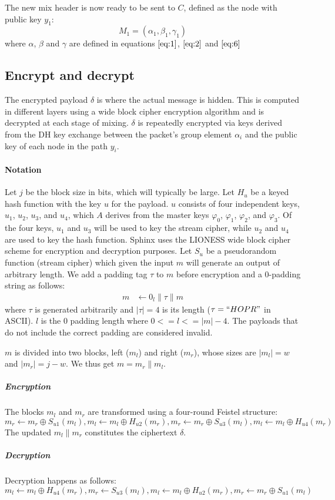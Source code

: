 The new mix header is now ready to be sent to $C$, defined as the node with public key $y_1$:
$$M_1=(\alpha_1,\beta_1,\gamma_1)$$
where $\alpha$, $\beta$ and $\gamma$ are defined in equations $\ref{eq:1}$, $\ref{eq:2}$ and $\ref{eq:6}$
\subsection{Encrypt and decrypt}
The encrypted payload $\delta$ is where the actual message is hidden. This is computed in different layers using a wide block cipher encryption algorithm and is decrypted at each stage of mixing.
$\delta$ is repeatedly encrypted via keys derived from the DH key exchange between the packet’s group element $\alpha_i$ and the public key of each node in the path $y_i$.

\paragraph{Notation}
Let $j$ be the block size in bits, which will typically be large. Let $H_u$ be a keyed hash function with the key $u$ for the payload. $u$ consists of four independent keys, $u_1$, $u_2$, $u_3$, and $u_4$, which $A$ derives from the master keys $\varphi_0$, $\varphi_1$, $\varphi_2$, and $\varphi_3$. Of the four keys, $u_1$ and $u_3$ will be used to key the stream cipher, while $u_2$ and $u_4$ are used to key the hash function. Sphinx uses the LIONESS wide block cipher scheme for encryption and decryption purposes.
Let $S_u$ be a pseudorandom function (stream cipher) which given the input $m$ will generate an output of arbitrary length. We add a padding tag $\tau$ to $m$ before encryption and a 0-padding string as follows:
\begin{align}
   m &\leftarrow 0_{l} \|\tau\|m
    \end{align}
where $\tau$ is generated arbitrarily and $|\tau|=4$ is its length ($\tau=``HOPR "$ in ASCII). $l$ is the $0$ padding length where
$0 <= l <= |m| - 4$. The payloads that do not include the correct padding are considered invalid.

$m$ is divided into two blocks, left ($m_l$) and right ($m_r$), whose sizes are $|m_l|=w$ and $|m_r|=j-w$. We thus get $m=m_r\|m_l$.
\subparagraph{Encryption}
The blocks $m_l$ and $m_r$ are transformed using a four-round Feistel structure:
$$m_r\leftarrow m_r \oplus S_{u1}(m_l), m_l\leftarrow m_l \oplus H_{u2}(m_r), m_r\leftarrow m_r\oplus S_{u3}(m_l), m_l\leftarrow m_l\oplus H_{u4}(m_r)$$
The updated $m_l\|m_r$ constitutes the ciphertext $\delta$.
\subparagraph{Decryption} Decryption happens as follows:
$$m_l\leftarrow m_l\oplus H_{u4}(m_r), m_r\leftarrow S_{u3}(m_l), m_l\leftarrow m_l\oplus H_{u2}(m_r), m_r\leftarrow m_r\oplus S_{u1}(m_l)$$
